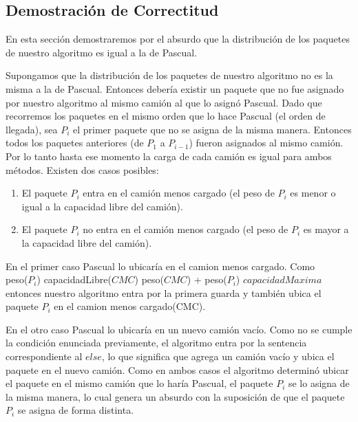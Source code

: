 \subsection{Demostraci\'on de Correctitud}
\par{
En esta secci\'on demostraremos por el absurdo que la distribuci\'on de los paquetes de nuestro algoritmo es igual a la de Pascual.



Supongamos que la distribuci\'on de los paquetes de nuestro algoritmo no es la misma a la de Pascual.
Entonces deber\'ia existir un paquete que no fue asignado por nuestro algoritmo al mismo cami\'on al que lo asign\'o Pascual.
Dado que recorremos los paquetes en el mismo orden que lo hace Pascual (el orden de llegada), sea $P_i$ el primer paquete que no se asigna de la misma manera.
Entonces todos los paquetes anteriores (de $P_1$ a $P_{i-1}$) fueron asignados al mismo camión. Por lo tanto hasta ese momento la carga de cada cami\'on es igual para ambos m\'etodos.
Existen dos casos posibles:
\begin{enumerate}
	\item El paquete $P_i$ entra en el cami\'on menos cargado (el peso de $P_i$ es menor o igual a la capacidad libre del cami\'on).
	\item El paquete $P_i$ no entra en el cami\'on menos cargado (el peso de $P_i$ es mayor a la capacidad libre del cami\'on).
\end{enumerate}

En el primer caso Pascual lo ubicar\'ia en el camion menos cargado. Como \\


peso($P_i$) \leq capacidadLibre($CMC$) \Rightarrow peso($CMC$) + peso($P_i$) \leq $capacidadMaxima$  \\

entonces nuestro algoritmo entra por la primera guarda y tambi\'en ubica el paquete $P_i$ en el camion menos cargado(CMC).

En el otro caso Pascual lo ubicar\'ia en un nuevo cami\'on vac\'io. Como no se cumple la condici\'on enunciada previamente, el algoritmo entra por la sentencia correspondiente al $else$, lo que significa que agrega un cami\'on vac\'io y ubica el paquete en el nuevo cami\'on.
Como en ambos casos el algoritmo determin\'o ubicar el paquete en el mismo cami\'on que lo har\'ia Pascual, el paquete $P_i$ se lo asigna de la misma manera, lo cual genera un absurdo con la suposici\'on de que el paquete $P_i$ se asigna de forma distinta.
}

